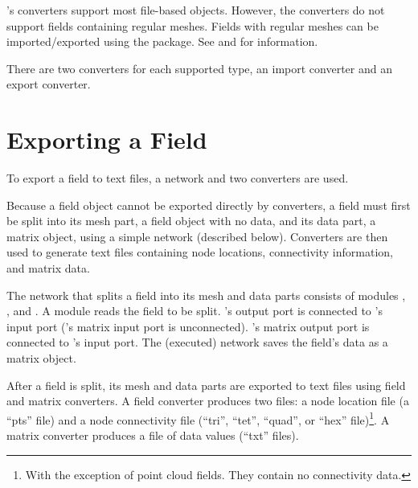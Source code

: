 
\sr{}'s converters support most \sr{} file-based objects.  However,
the converters do not support fields containing regular meshes.
Fields with regular meshes can be imported/exported using the
 package.  See  and
for information.

There are two converters for each supported \sr{} type, an import
converter and an export converter.

\section{Exporting a Field}
\label{sec:export_field}

To export a \sr{} field to text files, a \sr{} network and two
converters are used.

Because a field object cannot be exported directly by converters, a
field must first be split into its mesh part, a field object with no
data, and its data part, a matrix object, using a simple \sr{} network
(described below).  Converters are then used to generate text files
containing node locations, connectivity information, and matrix data.

The \sr{} network that splits a field into its mesh and data parts
consists of modules ,
, and .  A
 module reads the field to be split.
's output port is connected to
's input port ('s
matrix input port is unconnected).  's
matrix output port is connected to 's input
port.  The (executed) network saves the field's data as a \sr{} matrix
object.

After a field is split, its mesh and data parts are exported to text
files using field and matrix converters.  A field converter produces
two files: a node location file (a ``pts'' file) and a node
connectivity file (``tri'', ``tet'', ``quad'', or ``hex''
file)\footnote{With the exception of point cloud fields.  They
  contain no connectivity data.}.  A matrix converter produces a file
of data values (``txt'' files).

